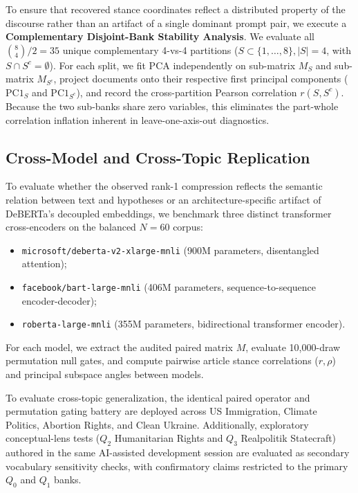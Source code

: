 To ensure that recovered stance coordinates reflect a distributed property of the discourse rather than an artifact of a single dominant prompt pair, we execute a \textbf{Complementary Disjoint-Bank Stability Analysis}. We evaluate all $\binom{8}{4}/2 = 35$ unique complementary 4-vs-4 partitions ($S \subset \{1, \ldots, 8\}, |S|=4$, with $S \cap S^c = \emptyset$). For each split, we fit PCA independently on sub-matrix $M_S$ and sub-matrix $M_{S^c}$, project documents onto their respective first principal components ($\mathrm{PC1}_S$ and $\mathrm{PC1}_{S^c}$), and record the cross-partition Pearson correlation $r(S, S^c)$. Because the two sub-banks share zero variables, this eliminates the part-whole correlation inflation inherent in leave-one-axis-out diagnostics.

\subsection{Cross-Model and Cross-Topic Replication}
\label{sec:meth_cross_model}

To evaluate whether the observed rank-1 compression reflects the semantic relation between text and hypotheses or an architecture-specific artifact of DeBERTa's decoupled embeddings, we benchmark three distinct transformer cross-encoders on the balanced $N=60$ corpus:
\begin{itemize}
    \item \texttt{microsoft/deberta-v2-xlarge-mnli} (900M parameters, disentangled attention);
    \item \texttt{facebook/bart-large-mnli} (406M parameters, sequence-to-sequence encoder-decoder);
    \item \texttt{roberta-large-mnli} (355M parameters, bidirectional transformer encoder).
\end{itemize}
For each model, we extract the audited paired matrix $M$, evaluate 10,000-draw permutation null gates, and compute pairwise article stance correlations ($r, \rho$) and principal subspace angles between models.

To evaluate cross-topic generalization, the identical paired operator and permutation gating battery are deployed across US Immigration, Climate Politics, Abortion Rights, and Clean Ukraine. Additionally, exploratory conceptual-lens tests ($Q_2$ Humanitarian Rights and $Q_3$ Realpolitik Statecraft) authored in the same AI-assisted development session are evaluated as secondary vocabulary sensitivity checks, with confirmatory claims restricted to the primary $Q_0$ and $Q_1$ banks.

